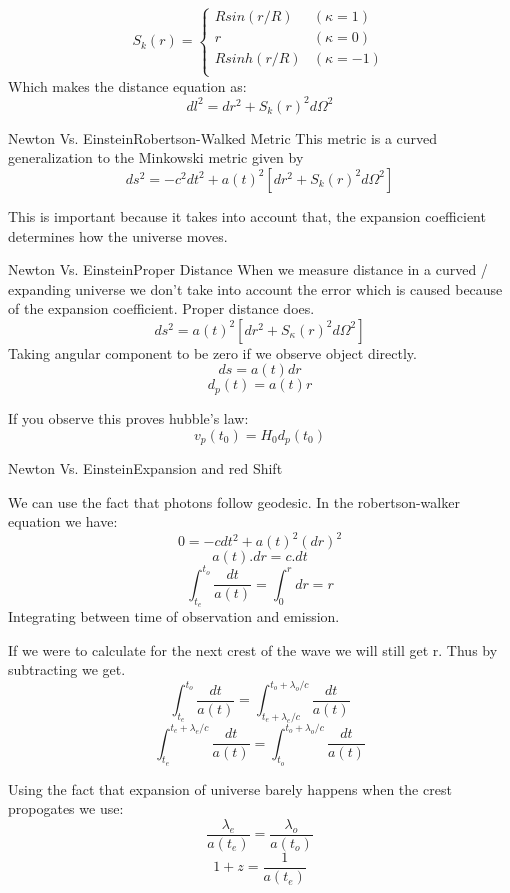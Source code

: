 \begin{frame}
	$$ S_k(r) = \begin{cases}
		Rsin(r/R) & (\kappa = 1) \\
		r & (\kappa = 0) \\
		Rsinh(r/R) & (\kappa = -1) \\
	\end{cases}$$
	Which makes the distance equation as:
	$$ dl^2 = dr^2 + S_k(r)^2 d\Omega^2 $$

\end{frame}

\begin{frame}{Newton Vs. Einstein}{Robertson-Walked Metric}
	This metric is a curved generalization to the Minkowski metric given by
	$$ ds^2 = -c^2 dt^2 + a(t)^2 [ dr^2 + S_k(r)^2 d\Omega^2 ] $$

	This is important because it takes into account that, the expansion
	coefficient determines how the universe moves.
\end{frame}


\begin{frame}{Newton Vs. Einstein}{Proper Distance}
	When we measure distance in a curved / expanding universe we don't take
	into account the error which is caused because of the expansion
	coefficient. Proper distance does.
	$$ ds^2  = a(t)^2 [dr^2 + S_\kappa (r)^2 d\Omega^2] $$
	Taking angular component to be zero if we observe object directly.
	$$ ds = a(t)dr $$
	$$ d_p(t) = a(t)r $$

	If you observe this proves hubble's law:
	$$ v_p(t_0) = H_0 d_p(t_0) $$
\end{frame}

\begin{frame}{Newton Vs. Einstein}{Expansion and red Shift}

	We can use the fact that photons follow geodesic. In the
	robertson-walker equation we have:
	$$ 0 = -cdt^2 + a(t)^2 (dr)^2 $$
	$$ a(t).dr = c.dt $$
	$$ \int^{t_o}_{t_e}\frac{dt}{a(t)} = \int^{r}_{0} dr = r $$
	Integrating between time of observation and emission.

	If we were to calculate for the next crest of the wave we will still get
	r.
	Thus by subtracting we get.
	$$ \int_{t_e}^{t_o} \frac{dt}{a(t)} = \int_{t_e + \lambda_e / c}^{ t_o + \lambda_o / c } \frac{dt}{a(t)} $$
	$$ \int^{t_e + \lambda_e / c}_{t_e} \frac{dt}{a(t)} = \int^{ t_o +
	\lambda_o / c }_{t_o} \frac{dt}{a(t)} $$
\end{frame}

\begin{frame}
	Using the fact that expansion of universe barely happens when the crest
	propogates we use:
	$$ \frac{\lambda_e}{a(t_e)} =  \frac{\lambda_o}{a(t_o)}$$
	$$ 1 + z =  \frac{1}{a(t_e)} $$
\end{frame}
